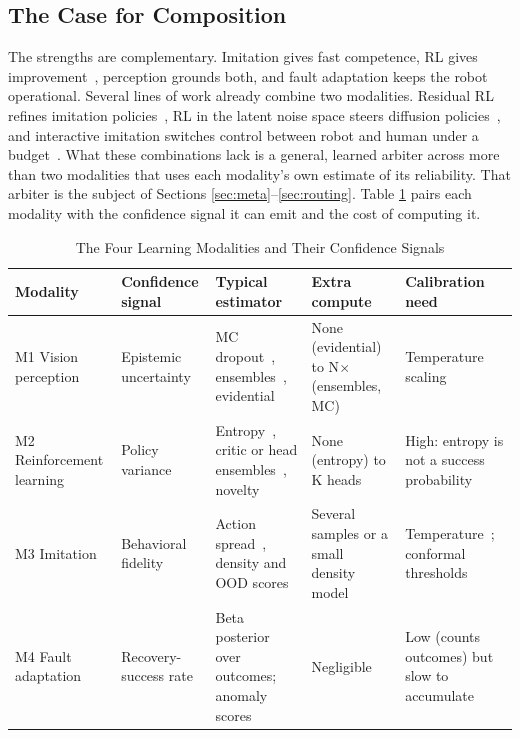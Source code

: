 \documentclass[journal]{IEEEtran}
\begin{document}
\subsection{The Case for Composition}\label{sec:composition}
The strengths are complementary. Imitation gives fast competence, RL gives improvement~\cite{Yuan2025,Ankile2025}, perception grounds both, and fault adaptation keeps the robot operational. Several lines of work already combine two modalities. Residual RL refines imitation policies~\cite{Yuan2025,Ankile2025}, RL in the latent noise space steers diffusion policies~\cite{Wagenmaker2025}, and interactive imitation switches control between robot and human under a budget~\cite{Hoque2021}. What these combinations lack is a general, learned arbiter across more than two modalities that uses each modality's own estimate of its reliability. That arbiter is the subject of Sections \ref{sec:meta}--\ref{sec:routing}. Table \ref{tab:signals} pairs each modality with the confidence signal it can emit and the cost of computing it.

\begin{table}[!t]
\centering
\caption{The Four Learning Modalities and Their Confidence Signals}\label{tab:signals}%
\footnotesize
\begin{tabular}{@{}>{\raggedright\arraybackslash}p{0.160\dimexpr\textwidth-10\tabcolsep\relax}>{\raggedright\arraybackslash}p{0.160\dimexpr\textwidth-10\tabcolsep\relax}>{\raggedright\arraybackslash}p{0.280\dimexpr\textwidth-10\tabcolsep\relax}>{\raggedright\arraybackslash}p{0.180\dimexpr\textwidth-10\tabcolsep\relax}>{\raggedright\arraybackslash}p{0.220\dimexpr\textwidth-10\tabcolsep\relax}@{}}
\toprule
\textbf{Modality} & \textbf{Confidence signal} & \textbf{Typical estimator} & \textbf{Extra compute} & \textbf{Calibration need} \\ \midrule
M1 Vision perception & Epistemic uncertainty & MC dropout~\cite{Gal2016}, ensembles~\cite{Lakshminarayanan2017}, evidential~\cite{Sensoy2018} & None (evidential) to N\ensuremath{\times } (ensembles, MC) & Temperature scaling~\cite{Guo2017} \\
M2 Reinforcement learning & Policy variance & Entropy~\cite{Haarnoja2018}, critic or head ensembles~\cite{Osband2016}, novelty~\cite{Burda2019} & None (entropy) to K heads & High: entropy is not a success probability \\
M3 Imitation & Behavioral fidelity & Action spread~\cite{Agia2024}, density and OOD scores~\cite{Xu2025,Romer2025} & Several samples or a small density model & Temperature~\cite{Wu2024}; conformal thresholds \\
M4 Fault adaptation & Recovery-success rate & Beta posterior over outcomes; anomaly scores & Negligible & Low (counts outcomes) but slow to accumulate \\
\bottomrule
\end{tabular}
\end{table}
\end{document}
